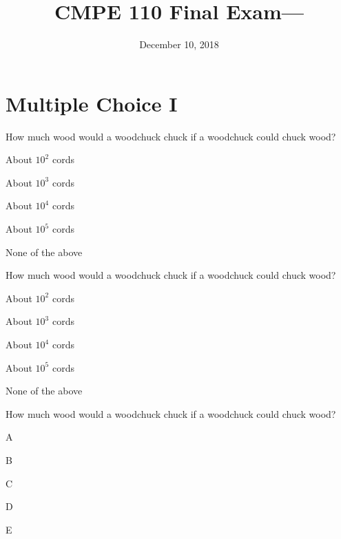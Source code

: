 \documentclass[11pt,nochoiceboxes,solutions]{exam3}
\begin{document}
\title{CMPE 110 Final Exam---\fbox{\textbf{\examversionname}}}
\date{December 10, 2018}
\maketitle

\thispagestyle{fancy}
\setlength{\partopsep}{0pt}

\section*{Multiple Choice I}

\begin{problem}{2}
  How much wood would a woodchuck chuck if a woodchuck could chuck wood?
  \begin{exammc}[acbed]
    \item *About $10^2$ cords
    \item About $10^3$ cords
    \item About $10^4$ cords
    \item About $10^5$ cords
    \item None of the above
  \end{exammc}
\end{problem}

\begin{problem}{2}
  How much wood would a woodchuck chuck if a woodchuck could chuck wood?
  \begin{multichoice}[set=A]
    \item *About $10^2$ cords
    \item About $10^3$ cords
    \item About $10^4$ cords
    \item About $10^5$ cords
    \item None of the above
  \end{multichoice}
\end{problem}

\begin{problem}{2}
  How much wood would a woodchuck chuck if a woodchuck could chuck wood?
  \begin{multichoice}[order=badce]
    \item A
    \item B
    \item C
    \item D
    \item E
  \end{multichoice}
\end{problem}
\end{document}
